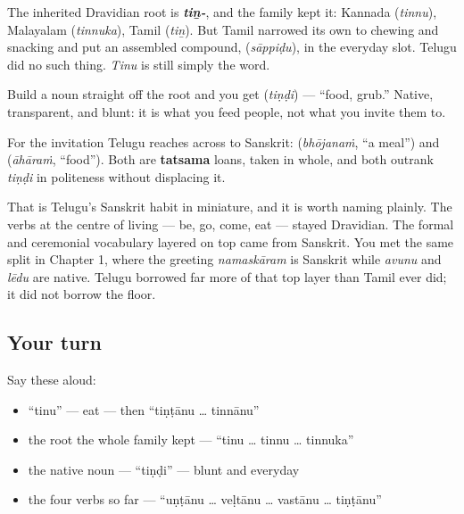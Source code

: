 The inherited Dravidian root is \emph{\textbf{tiṉ-}}, and the family kept it: Kannada \textbf{} (\emph{tinnu}), Malayalam \textbf{} (\emph{tinnuka}), Tamil \textbf{} (\emph{tiṉ}). But Tamil narrowed its own to chewing and snacking and put an assembled compound, \textbf{} (\emph{sāppiḍu}), in the everyday slot. Telugu did no such thing. \emph{Tinu} is still simply the word.

\begin{cousinweb}
Build a noun straight off the root and you get \textbf{} (\emph{tiṇḍi}) — \textquotedblleft{}food, grub.\textquotedblright{} Native, transparent, and blunt: it is what you feed people, not what you invite them to.

For the invitation Telugu reaches across to Sanskrit: \textbf{} (\emph{bhōjanaṁ}, \textquotedblleft{}a meal\textquotedblright{}) and \textbf{} (\emph{āhāraṁ}, \textquotedblleft{}food\textquotedblright{}). Both are \textbf{tatsama} loans, taken in whole, and both outrank \emph{tiṇḍi} in politeness without displacing it.

That is Telugu's Sanskrit habit in miniature, and it is worth naming plainly. The verbs at the centre of living — be, go, come, eat — stayed Dravidian. The formal and ceremonial vocabulary layered on top came from Sanskrit. You met the same split in Chapter 1, where the greeting \emph{namaskāram} is Sanskrit while \emph{avunu} and \emph{lēdu} are native. Telugu borrowed far more of that top layer than Tamil ever did; it did not borrow the floor.
\end{cousinweb}

\subsection*{Your turn}
Say these aloud:

\begin{itemize}
\raggedright
  \item \textquotedblleft{}tinu\textquotedblright{} — eat — then \textquotedblleft{}tiṇṭānu … tinnānu\textquotedblright{}
  \item the root the whole family kept — \textquotedblleft{}tinu … tinnu … tinnuka\textquotedblright{}
  \item the native noun — \textquotedblleft{}tiṇḍi\textquotedblright{} — blunt and everyday
  \item the four verbs so far — \textquotedblleft{}uṇṭānu … veḷtānu … vastānu … tiṇṭānu\textquotedblright{}
\end{itemize}

